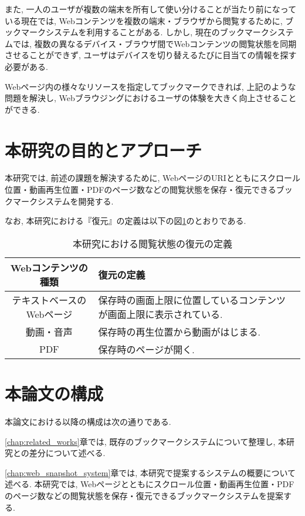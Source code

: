 また, 一人のユーザが複数の端末を所有して使い分けることが当たり前になっている現在では, Webコンテンツを複数の端末・ブラウザから閲覧するために, ブックマークシステムを利用することがある.
しかし, 現在のブックマークシステムでは, 複数の異なるデバイス・ブラウザ間でWebコンテンツの閲覧状態を同期させることができず, ユーザはデバイスを切り替えるたびに目当ての情報を探す必要がある.

Webページ内の様々なリソースを指定してブックマークできれば, 上記のような問題を解決し, Webブラウジングにおけるユーザの体験を大きく向上させることができる.

\section{本研究の目的とアプローチ}
本研究では, 前述の課題を解決するために, WebページのURIとともにスクロール位置・動画再生位置・PDFのページ数などの閲覧状態を保存・復元できるブックマークシステムを開発する.

なお, 本研究における『復元』の定義は以下の図\ref{tb:restore-definition}のとおりである.

\begin{table}[htbp]
  \begin{center}
    \caption{本研究における閲覧状態の復元の定義}
    \label{tb:restore-definition}
    \begin{tabular}{|c|l|l|}
      \hline
      Webコンテンツの種類 & 復元の定義 \\\hline\hline
      テキストベースのWebページ & 保存時の画面上限に位置しているコンテンツが画面上限に表示されている. \\\hline
      動画・音声 & 保存時の再生位置から動画がはじまる. \\\hline
      PDF & 保存時のページが開く. \\\hline
    \end{tabular}
  \end{center}
\end{table}

\section{本論文の構成}

本論文における以降の構成は次の通りである.

\ref{chap:related_works}章では, 既存のブックマークシステムについて整理し, 本研究との差分について述べる.

\ref{chap:web_snapshot_system}章では, 本研究で提案するシステムの概要について述べる.
本研究では, Webページとともにスクロール位置・動画再生位置・PDFのページ数などの閲覧状態を保存・復元できるブックマークシステムを提案する.

